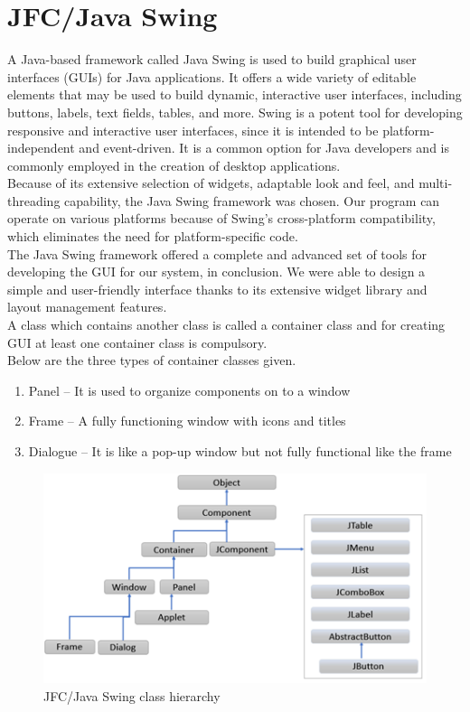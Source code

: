 \section{JFC/Java Swing}
\label{jfcjava-swing}
A Java-based framework called Java Swing is used to build graphical user interfaces (GUIs) for Java applications. It offers a wide variety of editable elements that may be used to build dynamic, interactive user interfaces, including buttons, labels, text fields, tables, and more. Swing is a potent tool for developing responsive and interactive user interfaces, since it is intended to be platform-independent and event-driven. It is a common option for Java developers and is commonly employed in the creation of desktop applications.\\
Because of its extensive selection of widgets, adaptable look and feel, and multi-threading capability, the Java Swing framework was chosen. Our program can operate on various platforms because of Swing's cross-platform compatibility, which eliminates the need for platform-specific code.\\
The Java Swing framework offered a complete and advanced set of tools for developing the GUI for our system, in conclusion. We were able to design a simple and user-friendly interface thanks to its extensive widget library and layout management features.\\
A class which contains another class is called a container class and for creating GUI at least one container class is compulsory.\\
 Below are the three types of container classes given.
\begin{enumerate}
\item Panel – It is used to organize components on to a window
\item Frame – A fully functioning window with icons and titles
\item Dialogue – It is like a pop-up window but not fully functional like the frame
\end{enumerate}

\begin{figure}
\centering
\includegraphics[width=4.5in]{images/java-swing-class-hiearchy.png}
\caption{JFC/Java Swing class hierarchy}
\end{figure}
\clearpage


